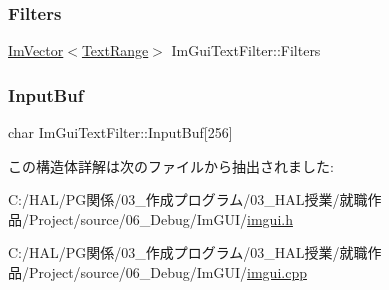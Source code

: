 \mbox{\label{struct_im_gui_text_filter_a5a930a339a9384e6bfadfa56a7c111fd}} 
\subsubsection{\texorpdfstring{Filters}{Filters}}
{\footnotesize\ttfamily \mbox{\hyperlink{class_im_vector}{Im\+Vector}}$<$\mbox{\hyperlink{struct_im_gui_text_filter_1_1_text_range}{Text\+Range}}$>$ Im\+Gui\+Text\+Filter\+::\+Filters}

\mbox{\label{struct_im_gui_text_filter_ad070acb1038199dd4e8f5d010c5cb5ba}} 
\subsubsection{\texorpdfstring{Input\+Buf}{InputBuf}}
{\footnotesize\ttfamily char Im\+Gui\+Text\+Filter\+::\+Input\+Buf\mbox{[}256\mbox{]}}



この構造体詳解は次のファイルから抽出されました\+:\begin{DoxyCompactItemize}
\item 
C\+:/\+H\+A\+L/\+P\+G関係/03\+\_\+作成プログラム/03\+\_\+\+H\+A\+L授業/就職作品/\+Project/source/06\+\_\+\+Debug/\+Im\+G\+U\+I/\mbox{\hyperlink{imgui_8h}{imgui.\+h}}\item 
C\+:/\+H\+A\+L/\+P\+G関係/03\+\_\+作成プログラム/03\+\_\+\+H\+A\+L授業/就職作品/\+Project/source/06\+\_\+\+Debug/\+Im\+G\+U\+I/\mbox{\hyperlink{imgui_8cpp}{imgui.\+cpp}}\end{DoxyCompactItemize}
